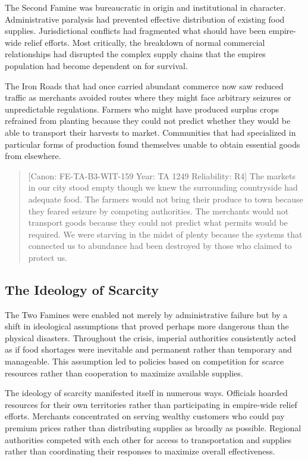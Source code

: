 The Second Famine was bureaucratic in origin and institutional in
character. Administrative paralysis had prevented effective distribution
of existing food supplies. Jurisdictional conflicts had fragmented what
should have been empire-wide relief efforts. Most critically, the
breakdown of normal commercial relationships had disrupted the complex
supply chains that the empire\textquotesingle s population had become
dependent on for survival.

The Iron Roads that had once carried abundant commerce now saw reduced
traffic as merchants avoided routes where they might face arbitrary
seizures or unpredictable regulations. Farmers who might have produced
surplus crops refrained from planting because they could not predict
whether they would be able to transport their harvests to market.
Communities that had specialized in particular forms of production found
themselves unable to obtain essential goods from elsewhere.

\begin{quote}
{[}Canon: FE-TA-B3-WIT-159 \textbar{} Year: TA 1249 \textbar{}
Reliability: R4{]} The markets in our city stood empty though we knew
the surrounding countryside had adequate food. The farmers would not
bring their produce to town because they feared seizure by competing
authorities. The merchants would not transport goods because they could
not predict what permits would be required. We were starving in the
midst of plenty because the systems that connected us to abundance had
been destroyed by those who claimed to protect us.
\end{quote}

\subsection{The Ideology of Scarcity}\label{the-ideology-of-scarcity}

The Two Famines were enabled not merely by administrative failure but by
a shift in ideological assumptions that proved perhaps more dangerous
than the physical disasters. Throughout the crisis, imperial authorities
consistently acted as if food shortages were inevitable and permanent
rather than temporary and manageable. This assumption led to policies
based on competition for scarce resources rather than cooperation to
maximize available supplies.

The ideology of scarcity manifested itself in numerous ways. Officials
hoarded resources for their own territories rather than participating in
empire-wide relief efforts. Merchants concentrated on serving wealthy
customers who could pay premium prices rather than distributing supplies
as broadly as possible. Regional authorities competed with each other
for access to transportation and supplies rather than coordinating their
responses to maximize overall effectiveness.

